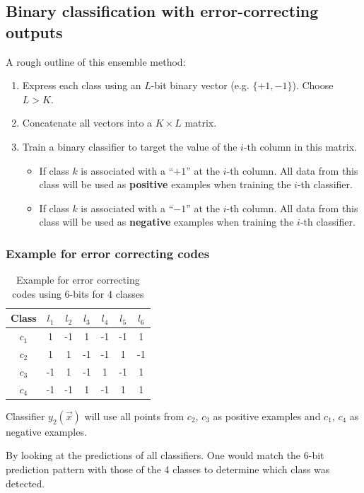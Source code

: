 \subsection{Binary classification with error-correcting outputs}

\begin{frame}{\subsecname}

A rough outline of this ensemble method:

\begin{enumerate}
\item Express each class using an $L$-bit binary vector (e.g. $\{+1,-1\}$). Choose $L>K$.
\item Concatenate all vectors into a $K \times L$ matrix. 
\item Train a binary classifier to target the value of the $i$-th column in this matrix.
    \begin{itemize}
    \item If class $k$ is associated with a ``$+1$'' at the $i$-th column. All data from this class will be used as \textbf{positive} examples when training the $i$-th classifier.
    \item If class $k$ is associated with a ``$-1$'' at the $i$-th column. All data from this class will be used as \textbf{negative} examples when training the $i$-th classifier.
    \end{itemize}
\end{enumerate}
    
\end{frame}

\begin{frame}\frametitle{Example for error correcting codes}

\begin{table}[]
{%
\begin{tabular}{|c|c|c|c|c|c|c|}
\hline
Class & $l_1$ & $l_2$ & $l_3$ & $l_4$ & $l_5$ & $l_6$ \\ \hline\hline
$c_{1}$ & 1 & -1 & 1 & -1 & -1 & 1 \\ \hline
$c_{2}$ & 1 & 1 & -1 & -1 & 1 & -1 \\ \hline
$c_{3}$ & -1 & 1 & -1 & 1 & -1 & 1 \\ \hline
$c_{4}$ & -1 & -1 & 1 & -1 & 1 & 1 \\ \hline
\end{tabular}%
}
\caption{Example for error correcting codes using 6-bits for 4 classes}
\end{table}

Classifier $y_{2}(\vec x)$ will use all points from $c_{2}$, $c_{3}$ as positive examples and $c_{1}$, $c_{4}$ as negative examples.

By looking at the predictions of all classifiers. One would match the $6$-bit prediction pattern with those of the 4 classes to determine which class was detected.

\end{frame}
